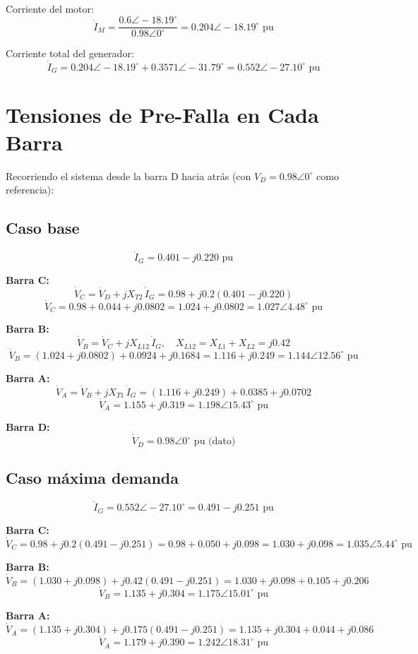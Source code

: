\documentclass[12pt,a4paper]{article}
\begin{document}
Corriente del motor:
\[
\dot{I}_M = \frac{0.6\angle-18.19^\circ}{0.98\angle0^\circ} = 0.204\angle-18.19^\circ\text{ pu}
\]

Corriente total del generador:
\[
\dot{I}_G = 0.204\angle-18.19^\circ + 0.3571\angle-31.79^\circ = 0.552\angle-27.10^\circ\text{ pu}
\]

\section{Tensiones de Pre-Falla en Cada Barra}

Recorriendo el sistema desde la barra D hacia atrás (con $V_D = 0.98\angle0^\circ$ como referencia):

\subsection{Caso base}

\[
\dot{I}_G = 0.401 - j0.220\text{ pu}
\]

\textbf{Barra C:}
\[
\dot{V}_C = \dot{V}_D + jX_{T2}\,\dot{I}_G = 0.98 + j0.2(0.401 - j0.220)
\]
\[
\dot{V}_C = 0.98 + 0.044 + j0.0802 = 1.024 + j0.0802 = 1.027\angle4.48^\circ\text{ pu}
\]

\textbf{Barra B:}
\[
\dot{V}_B = \dot{V}_C + jX_{L12}\,\dot{I}_G,\quad X_{L12} = X_{L1} + X_{L2} = j0.42
\]
\[
\dot{V}_B = (1.024 + j0.0802) + 0.0924 + j0.1684 = 1.116 + j0.249 = 1.144\angle12.56^\circ\text{ pu}
\]

\textbf{Barra A:}
\[
\dot{V}_A = \dot{V}_B + jX_{T1}\,\dot{I}_G = (1.116 + j0.249) + 0.0385 + j0.0702
\]
\[
\dot{V}_A = 1.155 + j0.319 = 1.198\angle15.43^\circ\text{ pu}
\]

\textbf{Barra D:}
\[
\dot{V}_D = 0.98\angle0^\circ\text{ pu (dato)}
\]

\subsection{Caso máxima demanda}

\[
\dot{I}_G = 0.552\angle-27.10^\circ = 0.491 - j0.251\text{ pu}
\]

\textbf{Barra C:}
\[
\dot{V}_C = 0.98 + j0.2(0.491 - j0.251) = 0.98 + 0.050 + j0.098 = 1.030 + j0.098 = 1.035\angle5.44^\circ\text{ pu}
\]

\textbf{Barra B:}
\[
\dot{V}_B = (1.030 + j0.098) + j0.42(0.491 - j0.251) = 1.030 + j0.098 + 0.105 + j0.206
\]
\[
\dot{V}_B = 1.135 + j0.304 = 1.175\angle15.01^\circ\text{ pu}
\]

\textbf{Barra A:}
\[
\dot{V}_A = (1.135 + j0.304) + j0.175(0.491 - j0.251) = 1.135 + j0.304 + 0.044 + j0.086
\]
\[
\dot{V}_A = 1.179 + j0.390 = 1.242\angle18.31^\circ\text{ pu}
\]
\end{document}
